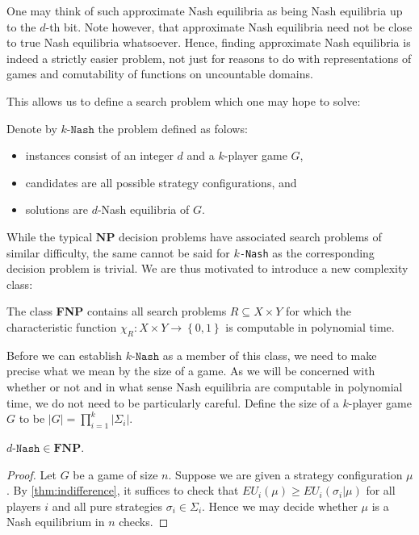 \documentclass{article}
\begin{document}
One may think of such approximate Nash equilibria as being Nash equilibria
up to the $d$-th bit. Note however, that approximate Nash equilibria
need not be close to true Nash equilibria whatsoever. Hence, finding
approximate Nash equilibria is indeed a strictly easier problem, not
just for reasons to do with representations of games and comutability
of functions on uncountable domains.

This allows us to define a search problem which one may hope to
solve:

\begin{definition}\label{def:nash}
  Denote by $k\texttt{-Nash}$ the problem defined as folows:
  \begin{itemize}
    \item instances consist of an integer $d$ and a $k$-player game $G$,
    \item candidates are all possible strategy configurations, and
    \item solutions are $d$-Nash equilibria of $G$.
  \end{itemize}
\end{definition}

While the typical $\textbf{NP}$ decision problems have associated search
problems of similar difficulty, the same cannot be said for $k$\texttt{-Nash}
as the corresponding decision problem is trivial. We are thus motivated
to introduce a new complexity class:

\begin{definition}
  The class \textbf{FNP} contains all search problems $R\subseteq X\times Y$
  for which the characteristic function $\chi_R : X\times
  Y\to\left\lbrace{0,1}\right\rbrace$ is computable in polynomial time.
\end{definition}

Before we can establish $k\texttt{-Nash}$ as a member of this class,
we need to make precise what we mean by the size of a game.
As we will be concerned with whether or not and in what sense Nash
equilibria are computable in polynomial time, we do not need to be
particularly careful. Define the size of a $k$-player game $G$ to be
$|G|=\prod_{i=1}^k|\Sigma_i|$.

\begin{corollary}
  $d\texttt{-Nash}\in\textbf{FNP}$.
  \begin{proof}
    Let $G$ be a game of size $n$. Suppose we are given a strategy
    configuration $\mu$. By \ref{thm:indifference}, it suffices to check that
    $EU_i(\mu) \geq EU_i(\sigma_i|\mu)$ for all players $i$ and all pure
    strategies $\sigma_i\in\Sigma_i$. Hence we may decide whether $\mu$ is a
    Nash equilibrium in $n$ checks.
  \end{proof}
\end{corollary}
\end{document}
